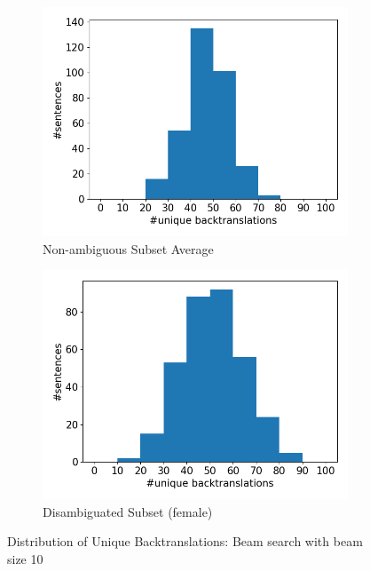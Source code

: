 \begin{figure}[!htb]
\begin{subfigure}{0.49\textwidth}
     \end{subfigure}
     \begin{subfigure}{0.49\textwidth}
         \centering
         \includegraphics[width=\textwidth]{figures/uniqueness/unique_beam10/unique_back_average.png}
         \caption{Non-ambiguous Subset Average}
         \label{fig:uniqueness_common}
     \end{subfigure}
     \hfill
     \begin{subfigure}{0.49\textwidth}
         \centering
         \includegraphics[width=\textwidth]{figures/uniqueness/unique_beam10/unique_back_female.png}
         \caption{Disambiguated Subset (female)}
         \label{fig:uniqueness_female}
     \end{subfigure}
        \caption[Distribution of Unique Backtranslations]{Distribution of Unique Backtranslations: Beam search with beam size 10}
        \label{fig:uniqueness_graphs_10}

\end{figure}

